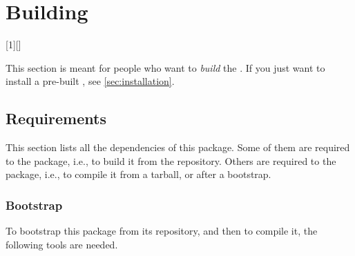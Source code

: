
\chapter{Building \usdk}
\label{sec:build}

[1][]
  {\cxxPre%
    }
  {\cxxPost}

This section is meant for people who want to \emph{build} the \usdk.  If
you just want to install a pre-built \usdk, see \autoref{sec:installation}.

\section{Requirements}
\label{sec:build:req}

This section lists all the dependencies of this package.  Some of them are
required to  the package, i.e., to build it from the
repository.  Others are required to  the package, i.e., to
compile it from a tarball, or after a bootstrap.

\subsection{Bootstrap}

To bootstrap this package from its repository, and then to compile it,
the following tools are needed.

